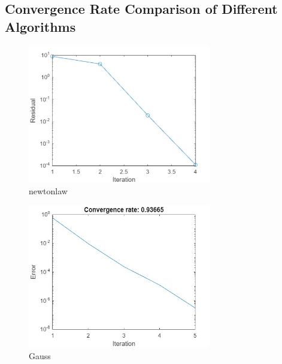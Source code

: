 \documentclass[12pt, a4paper, oneside]{ctexart}
\begin{document}
\begin{spacing}{2.0}
\section{Convergence Rate Comparison of Different Algorithms}
\begin{figure}[H]
	\centering
	\includegraphics[width=8cm]{newtonlaw.jpg}
	\caption{newtonlaw}
\end{figure}
\begin{figure}[H]
	\centering
	\includegraphics[width=8cm]{Gauss.jpg}
	\caption{Gauss}
\end{figure}

\end{spacing}{}



\end{document}
